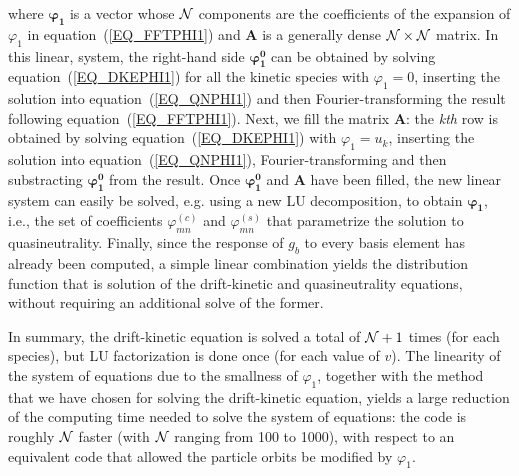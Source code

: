where $\pmb{\varphi_1}$ is a vector whose ${\cal{N}}$ components are the coefficients of the expansion of $\varphi_1$ in equation~(\ref{EQ_FFTPHI1}) and $\mathbf{A}$ is a generally dense ${\cal{N}}\times{\cal{N}}$ matrix. In this linear, system, the right-hand side $\pmb{\varphi_1^{0}}$ can be obtained by solving equation~(\ref{EQ_DKEPHI1}) for all the kinetic species with $\varphi_1=0$, inserting the solution into equation~(\ref{EQ_QNPHI1}) and then Fourier-transforming the result following equation~(\ref{EQ_FFTPHI1}). Next, we fill the matrix $\mathbf{A}$: the \textit{kth} row is obtained by solving equation~(\ref{EQ_DKEPHI1}) with $\varphi_1= u_k$,  inserting the solution into equation~(\ref{EQ_QNPHI1}), Fourier-transforming and then substracting $\pmb{\varphi_1^{0}}$ from the result. Once $\pmb{\varphi_1^{0}}$ and $\mathbf{A}$ have been filled, the new linear system can easily be solved, e.g. using a new LU decomposition, to obtain $\pmb{\varphi_1}$, i.e., the set of coefficients $\varphi^{(c)}_{mn}$ and $\varphi^{(s)}_{mn}$ that parametrize the solution to quasineutrality. Finally, since the response of $g_b$ to every basis element has already been computed, a simple linear combination yields the distribution function that is solution of the drift-kinetic and quasineutrality equations, without requiring an additional solve of the former.

In summary, the drift-kinetic equation is solved a total of ${\cal{N}}+1$ times (for each species), but LU factorization is done once (for each value of $v$). The linearity of the system of equations due to the smallness of $\varphi_1$, together with the method that we have chosen for solving the drift-kinetic equation, yields a large reduction of the computing time needed to solve the system of equations: the code is roughly ${\cal{N}}$ faster (with ${\cal{N}}$  ranging from 100 to 1000), with respect to an equivalent code that allowed the particle orbits be modified by $\varphi_1$.


